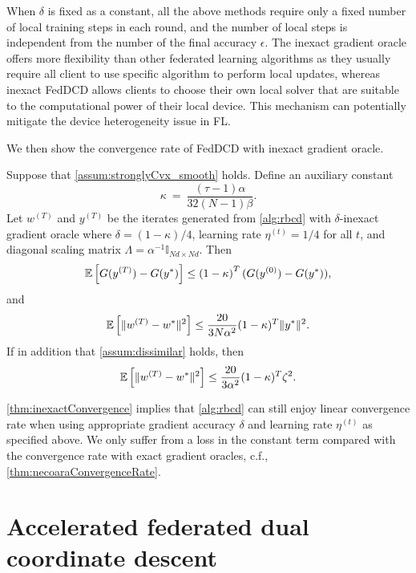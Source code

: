 When $\delta$ is fixed as a constant, all the above methods require only a fixed number of local training steps in each round, and the number of local steps is independent from the number of the final accuracy $\epsilon$. 
The inexact gradient oracle offers more flexibility than other federated learning algorithms as they usually require all client to use specific algorithm to perform local updates, whereas inexact FedDCD allows clients to choose their own local solver that are suitable to the computational power of their local device. This mechanism can potentially mitigate the device heterogeneity issue in FL.

We then show the convergence rate of FedDCD with inexact gradient oracle.
\begin{theorem} \label{thm:inexactConvergence}
    Suppose that \autoref{assum:stronglyCvx_smooth} holds. Define an auxiliary constant
    \[\kappa ~=~ \frac{ (\tau-1) \alpha}{32 (N-1) \beta}.\]
    Let $w^{(T)}$ and $y^{(T)}$ be the iterates generated from \autoref{alg:rbcd} with $\delta$-inexact gradient oracle where $\delta=(1-\kappa)/4$, learning rate $\eta^{(t)} = 1/4$ for all $t$, and diagonal scaling matrix $\Lambda = \alpha^{-1} \mathbb{I}_{Nd \times Nd}$. Then
    \begin{equation} \label{eq:InexactDualConvergenceStrongCVX}
        \mathbb{E} \left[ G( y^{(T)} ) - G( y^* ) \right] \leq \left( 1 - \kappa \right)^{T} ( G(y^{(0)}) - G(y^*)  ), 
    \end{equation}
    and
    \begin{equation} \label{eq:InexactPrimalConvergenceStrongCVX}
        \mathbb{E} \left[ \| w^{(T)} - w^* \|^2 \right] \leq \frac{20}{3N\alpha^2}(1-\kappa)^T  \|y^*\|^2. 
    \end{equation}
    If in addition that \autoref{assum:dissimilar} holds, then
    \[\mathbb{E} \left[ \| w^{(T)} - w^* \|^2 \right] \leq \frac{20}{3\alpha^2}(1-\kappa)^T \zeta^2.\]
\end{theorem}

\autoref{thm:inexactConvergence} implies that \autoref{alg:rbcd} can still enjoy linear convergence rate when using appropriate gradient accuracy $\delta$ and learning rate $\eta^{(t)}$ as specified above. We only suffer from a loss in the constant term compared with the convergence rate with exact gradient oracles, c.f., \autoref{thm:necoaraConvergenceRate}.

\section{Accelerated federated dual coordinate descent}
\label{sec:accFedDCD}

